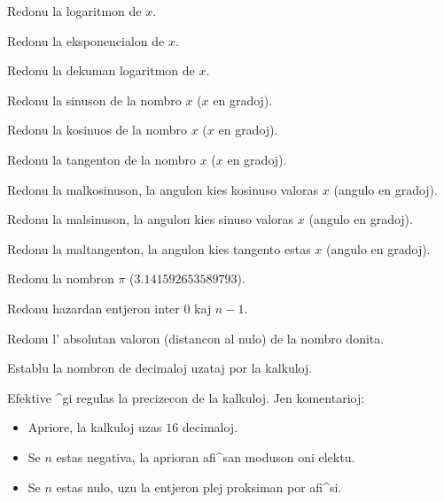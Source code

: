 
Redonu la logaritmon de $x$.


Redonu la eksponencialon de $x$.


Redonu la dekuman logaritmon de $x$.


Redonu la sinuson de la nombro $x$ ($x$ en gradoj).


Redonu la kosinuos de la nombro $x$ ($x$ en gradoj).


Redonu la tangenton de la nombro $x$ ($x$ en gradoj).


Redonu la malkosinuson, la angulon kies kosinuso valoras $x$ (angulo en gradoj).


Redonu la malsinuson, la angulon kies sinuso valoras $x$ (angulo en gradoj).


Redonu la maltangenton, la angulon kies tangento estas $x$ (angulo en gradoj).


Redonu la nombron $\pi$ ($3.141592653589793$).


Redonu hazardan entjeron inter $0$ kaj $n-1$.
 

Redonu l' absolutan valoron (distancon al nulo) de la nombro donita.


Establu la nombron de decimaloj uzataj por la kalkuloj.

Efektive ^gi regulas la precizecon de la kalkuloj.  Jen komentarioj:

\begin{itemize}
 \item Apriore, la kalkuloj uzas $16$ decimaloj.
 \item Se $n$ estas negativa, la aprioran afi^san moduson oni elektu.
 \item Se $n$ estas nulo, uzu la entjeron plej proksiman por afi^si.
\end{itemize}

